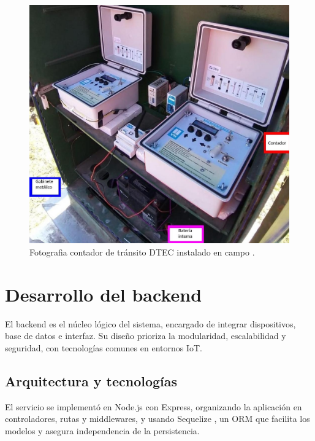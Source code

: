 \begin{itemize}
\begin{itemize}
\begin{figure}[H]
  \centering
  \includegraphics[width=1\linewidth]{./Figures/fotoGabinete.jpeg}
  \caption{Fotografia contador de tránsito DTEC instalado en campo \protect\footnotemark.}
  \label{fig:foto_gabinete}
\end{figure}

\end{itemize}

\end{itemize}

\section{Desarrollo del backend}

El backend es el núcleo lógico del sistema, encargado de integrar dispositivos, base de datos e interfaz. Su diseño prioriza la modularidad, escalabilidad y seguridad, con tecnologías comunes en entornos IoT.


\subsection{Arquitectura y tecnologías}

El servicio se implementó en Node.js con Express, organizando la aplicación en controladores, rutas y middlewares, y usando Sequelize \cite{sequelize}, un ORM \cite{fowler2002patterns} que facilita los modelos y asegura independencia de la persistencia.

